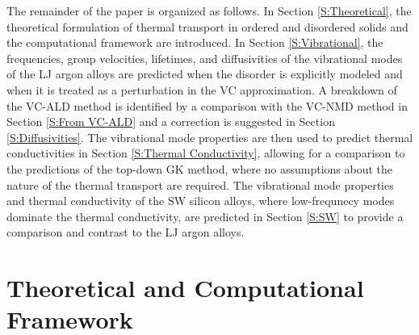 \documentclass[aps,prb,onecolumn,preprint,footinbib,superscriptaddress,amsmath,amssymb,floatfix]{revtex4}
\begin{document}
The remainder of the paper is organized as follows. 
In Section \ref{S:Theoretical}, the theoretical 
formulation of thermal transport in ordered and disordered solids 
and the computational framework are introduced. 
In Section \ref{S:Vibrational}, the frequencies, 
group velocities, lifetimes, and diffusivities of the 
vibrational modes of the LJ argon alloys are 
predicted when the disorder is explicitly modeled and when it is 
treated as a perturbation in the VC approximation. 
A breakdown of the VC-ALD method is identified by a comparison 
with the VC-NMD method in 
Section \ref{S:From VC-ALD}   
and a correction is suggested in Section \ref{S:Diffusivities}. 
The vibrational 
mode properties are then used to predict thermal conductivities 
in Section \ref{S:Thermal Conductivity}, 
allowing for a comparison to the predictions of the top-down  
GK method, where no assumptions about the nature of the 
thermal transport are required. The vibrational mode properties and 
thermal conductivity of the SW silicon alloys, where low-frequnecy modes 
dominate the thermal conductivity, are predicted in 
Section \ref{S:SW} to provide a comparison and contrast to the 
LJ argon alloys. 




\section{\label{S:Theoretical}Theoretical and Computational Framework}
\end{document}
